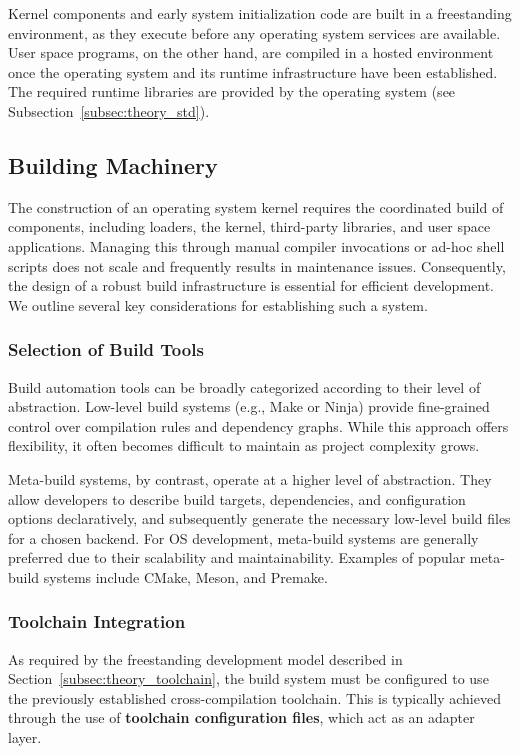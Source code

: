 \documentclass[a4paper,10pt,twoside]{report}
\theoremstyle{definition}
\begin{document}
Kernel components and early system initialization code are built in a freestanding environment, as they execute before any operating system services are available. User space programs, on the other hand, are compiled in a hosted environment once the operating system and its runtime infrastructure have been established. The required runtime libraries are provided by the operating system (see Subsection~\ref{subsec:theory_std}).

\subsection{Building Machinery}
\label{subsec:building_machinery}

The construction of an operating system kernel requires the coordinated build of components, including loaders, the kernel, third-party libraries, and user space applications. Managing this through manual compiler invocations or ad-hoc shell scripts does not scale and frequently results in maintenance issues. Consequently, the design of a robust build infrastructure is essential for efficient development. We outline several key considerations for establishing such a system.

\subsubsection{Selection of Build Tools}

Build automation tools can be broadly categorized according to their level of abstraction. Low-level build systems (e.g., Make or Ninja) provide fine-grained control over compilation rules and dependency graphs. While this approach offers flexibility, it often becomes difficult to maintain as project complexity grows.

Meta-build systems, by contrast, operate at a higher level of abstraction. They allow developers to describe build targets, dependencies, and configuration options declaratively, and subsequently generate the necessary low-level build files for a chosen backend. For OS development, meta-build systems are generally preferred due to their scalability and maintainability. Examples of popular meta-build systems include CMake, Meson, and Premake.

\subsubsection{Toolchain Integration}

As required by the freestanding development model described in Section~\ref{subsec:theory_toolchain}, the build system must be configured to use the previously established cross-compilation toolchain. This is typically achieved through the use of \textbf{toolchain configuration files}, which act as an adapter layer. 
\end{document}
